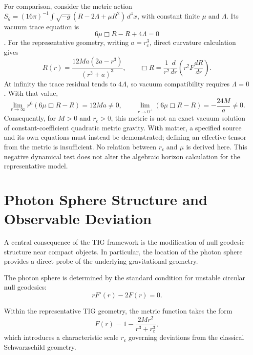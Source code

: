 \documentclass[11pt,a4paper]{article}
\begin{document}
For comparison, consider the metric action
\(S_g=(16\pi)^{-1}\int\sqrt{-g}(R-2\Lambda+\mu R^2)\,d^4x\),
with constant finite \(\mu\) and \(\Lambda\). Its vacuum trace equation is
\begin{equation}
6\mu\Box R-R+4\Lambda=0
\label{eq:vacuum_trace_test}
\end{equation}
\cite{sotiriou2010,defelice2010}. For the representative geometry, writing
\(a=r_c^3\), direct curvature calculation gives
\begin{equation}
R(r)=\frac{12Ma(2a-r^3)}{(r^3+a)^3},\qquad
\Box R=\frac{1}{r^2}\frac{d}{dr}\left(r^2F\frac{dR}{dr}\right).
\end{equation}
At infinity the trace residual tends to \(4\Lambda\), so vacuum compatibility
requires \(\Lambda=0\). With that value,
\begin{equation}
\lim_{r\to\infty}r^6(6\mu\Box R-R)=12Ma\ne0,
\qquad
\lim_{r\to0^+}(6\mu\Box R-R)=-\frac{24M}{a}\ne0.
\end{equation}
Consequently, for \(M>0\) and \(r_c>0\), this metric is not an exact vacuum
solution of constant-coefficient quadratic metric gravity. With matter, a
specified source and its own equations must instead be demonstrated; defining
an effective tensor from the metric is insufficient. No relation between
\(r_c\) and \(\mu\) is derived here. This negative dynamical test does not
alter the algebraic horizon calculation for the representative model.

\section{Photon Sphere Structure and Observable Deviation}

A central consequence of the TIG framework is the modification of null geodesic
structure near compact objects. In particular, the location of the photon sphere
provides a direct probe of the underlying gravitational geometry.

The photon sphere is determined by the standard condition for unstable circular
null geodesics:
\begin{equation}
r F'(r) - 2F(r) = 0.
\end{equation}

Within the representative TIG geometry, the metric function takes the form
\begin{equation}
F(r) = 1 - \frac{2M r^2}{r^3 + r_c^3},
\end{equation}
which introduces a characteristic scale \(r_c\) governing deviations from the
classical Schwarzschild geometry.
\end{document}
